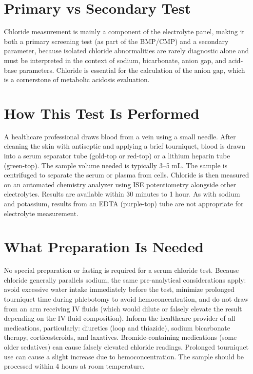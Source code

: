 \section*{Primary vs Secondary Test}
Chloride measurement is mainly a component of the electrolyte panel, making it both a primary screening test (as part of the BMP/CMP) and a secondary parameter, because isolated chloride abnormalities are rarely diagnostic alone and must be interpreted in the context of sodium, bicarbonate, anion gap, and acid-base parameters. Chloride is essential for the calculation of the anion gap, which is a cornerstone of metabolic acidosis evaluation.

\section*{How This Test Is Performed}
A healthcare professional draws blood from a vein using a small needle. After cleaning the skin with antiseptic and applying a brief tourniquet, blood is drawn into a serum separator tube (gold-top or red-top) or a lithium heparin tube (green-top). The sample volume needed is typically 3--5 mL. The sample is centrifuged to separate the serum or plasma from cells. Chloride is then measured on an automated chemistry analyzer using ISE potentiometry alongside other electrolytes. Results are available within 30 minutes to 1 hour. As with sodium and potassium, results from an EDTA (purple-top) tube are not appropriate for electrolyte measurement.

\section*{What Preparation Is Needed}
No special preparation or fasting is required for a serum chloride test. Because chloride generally parallels sodium, the same pre-analytical considerations apply: avoid excessive water intake immediately before the test, minimize prolonged tourniquet time during phlebotomy to avoid hemoconcentration, and do not draw from an arm receiving IV fluids (which would dilute or falsely elevate the result depending on the IV fluid composition). Inform the healthcare provider of all medications, particularly: diuretics (loop and thiazide), sodium bicarbonate therapy, corticosteroids, and laxatives. Bromide-containing medications (some older sedatives) can cause falsely elevated chloride readings. Prolonged tourniquet use can cause a slight increase due to hemoconcentration. The sample should be processed within 4 hours at room temperature.

